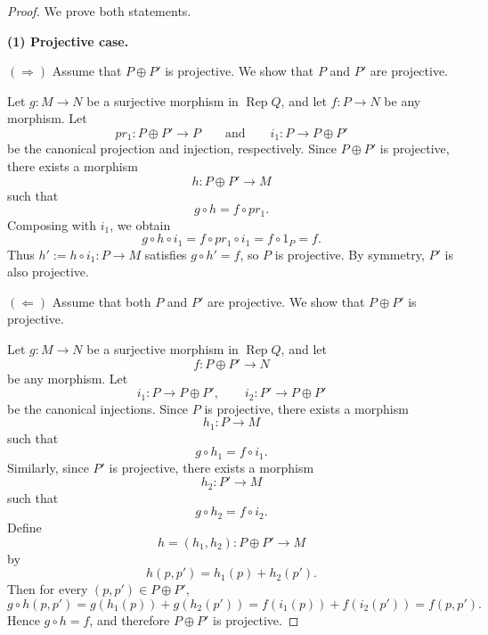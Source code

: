 \documentclass[11pt, a4paper]{report}
\begin{document}
\begin{proof}
We prove both statements.

\medskip

\noindent\textbf{(1) Projective case.}

\smallskip

\noindent
$(\Rightarrow)$ Assume that $P \oplus P'$ is projective. We show that $P$ and $P'$ are projective.

Let $g:M \to N$ be a surjective morphism in $\operatorname{Rep}Q$, and let
$f:P \to N$ be any morphism. Let
\[
pr_1:P \oplus P' \to P
\qquad\text{and}\qquad
i_1:P \to P \oplus P'
\]
be the canonical projection and injection, respectively. Since $P \oplus P'$ is projective,
there exists a morphism
\[
h:P \oplus P' \to M
\]
such that
\[
g \circ h = f \circ pr_1.
\]
Composing with $i_1$, we obtain
\[
g \circ h \circ i_1
=
f \circ pr_1 \circ i_1
=
f \circ 1_P
=
f.
\]
Thus $h' := h \circ i_1 : P \to M$ satisfies $g \circ h' = f$, so $P$ is projective.
By symmetry, $P'$ is also projective.

\begin{center}
\end{center}

\smallskip

\noindent
$(\Leftarrow)$ Assume that both $P$ and $P'$ are projective. We show that $P \oplus P'$ is projective.

Let $g:M \to N$ be a surjective morphism in $\operatorname{Rep}Q$, and let
\[
f:P \oplus P' \to N
\]
be any morphism. Let
\[
i_1:P \to P \oplus P',
\qquad
i_2:P' \to P \oplus P'
\]
be the canonical injections. Since $P$ is projective, there exists a morphism
\[
h_1:P \to M
\]
such that
\[
g \circ h_1 = f \circ i_1.
\]
Similarly, since $P'$ is projective, there exists a morphism
\[
h_2:P' \to M
\]
such that
\[
g \circ h_2 = f \circ i_2.
\]
Define
\[
h=(h_1,h_2):P \oplus P' \to M
\]
by
\[
h(p,p')=h_1(p)+h_2(p').
\]
Then for every $(p,p') \in P \oplus P'$,
\[
g \circ h(p,p')
=
g(h_1(p))+g(h_2(p'))
=
f(i_1(p))+f(i_2(p'))
=
f(p,p').
\]
Hence $g \circ h=f$, and therefore $P \oplus P'$ is projective.


\end{proof}
\end{document}

